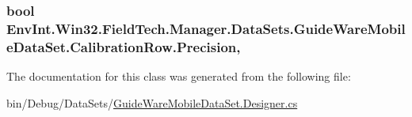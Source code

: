 \subsubsection[{Precision}]{\setlength{\rightskip}{0pt plus 5cm}bool Env\+Int.\+Win32.\+Field\+Tech.\+Manager.\+Data\+Sets.\+Guide\+Ware\+Mobile\+Data\+Set.\+Calibration\+Row.\+Precision\hspace{0.3cm}{\ttfamily [get]}, {\ttfamily [set]}}\label{class_env_int_1_1_win32_1_1_field_tech_1_1_manager_1_1_data_sets_1_1_guide_ware_mobile_data_set_1_1_calibration_row_a333d1fb84898c58d82a9ad1baa6e09bf}


The documentation for this class was generated from the following file\+:\begin{DoxyCompactItemize}
\item 
bin/\+Debug/\+Data\+Sets/\hyperlink{bin_2_debug_2_data_sets_2_guide_ware_mobile_data_set_8_designer_8cs}{Guide\+Ware\+Mobile\+Data\+Set.\+Designer.\+cs}\end{DoxyCompactItemize}
